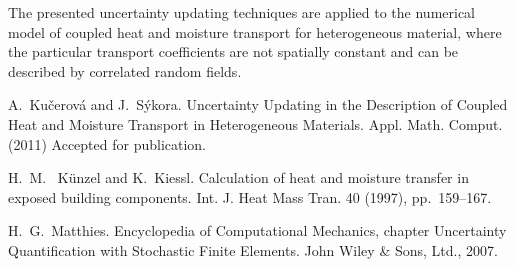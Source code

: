 The presented uncertainty updating techniques are applied to the numerical model of coupled heat and moisture transport \cite{Kunzel:1997} for heterogeneous material, where the particular transport coefficients are not spatially constant and can be described by correlated random fields.


\begin{thebibliography}{10}

{\sc A.~Ku\v{c}erov\'a and J.~S\'ykora}.
{Uncertainty Updating in the Description of Coupled Heat and Moisture Transport in Heterogeneous Materials}. Appl. Math. Comput. (2011) Accepted for publication.

{\sc H.~M.~ K\"{u}nzel and K.~Kiessl}. {Calculation of heat and moisture transfer in exposed building components}. Int. J. Heat Mass Tran. 40 (1997), pp.~159--167.

{\sc H.~G.~Matthies}. {Encyclopedia of Computational Mechanics}, chapter Uncertainty Quantification with Stochastic Finite Elements. John Wiley \& Sons, Ltd., 2007.

\end{thebibliography}